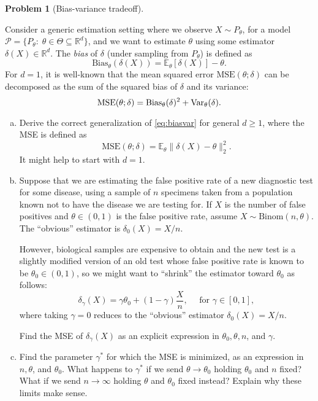 \documentclass{article}
\newcommand{\cP}{\mathcal{P}}
\newcommand{\EE}{\mathbb{E}}
\newcommand{\RR}{\mathbb{R}}
\newcommand{\Var}{\textnormal{Var}}
\theoremstyle{definition}
\newtheorem{problem}{Problem}
\begin{document}
\begin{problem}[Bias-variance tradeoff]
  \label{prob:bias-var}
  
  Consider a generic estimation setting where we observe $X \sim P_\theta$, for a model $\cP = \{P_\theta:\; \theta \in \Theta \subseteq \RR^d\}$, and we want to estimate $\theta$ using some estimator $\delta(X) \in \RR^d$. The {\em bias} of $\delta$ (under sampling from $P_\theta$) is defined as
  \[
  \text{Bias}_\theta(\delta(X)) = \EE_\theta[\delta(X)] - \theta. 
  \]
  For $d=1$, it is well-known that the mean squared error $\text{MSE}(\theta; \delta)$ can be decomposed as the sum of the squared bias of $\delta$ and its variance:
  \begin{equation}\label{eq:biasvar}
    \text{MSE}(\theta; \delta) = \text{Bias}_\theta(\delta)^2 + \Var_\theta(\delta).
  \end{equation}
  
  
  \begin{enumerate}[(a)]
  \item Derive the correct generalization of \eqref{eq:biasvar} for general $d \geq 1$, where the MSE is defined as
    \[
    \text{MSE}(\theta; \delta) = \EE_\theta \|\delta(X) - \theta\|_2^2.
    \]
    It might help to start with $d=1$.
    
    
    
  \item Suppose that we are estimating the false positive rate of a new diagnostic test for some disease, using a sample of $n$ specimens taken from a population known not to have the disease we are testing for. If $X$ is the number of false positives and $\theta \in (0,1)$ is the false positive rate, assume $X \sim \text{Binom}(n, \theta)$. The ``obvious'' estimator is $\delta_0(X) = X/n$.
    
    However, biological samples are expensive to obtain and the new test is a slightly modified version of an old test whose false positive rate is known to be $\theta_0 \in (0,1)$, so we might want to ``shrink'' the estimator toward $\theta_0$ as follows:
    \[
    \delta_{\gamma}(X) = \gamma \theta_0 + (1-\gamma) \frac{X}{n}, \quad \text{ for } \gamma \in [0,1],
    \]
    where taking $\gamma = 0$ reduces to the ``obvious'' estimator $\delta_0(X) = X/n$.
    
    Find the MSE of $\delta_\gamma(X)$ as an explicit expression in $\theta_0, \theta, n$, and $\gamma$.
    
    
    
  \item Find the parameter $\gamma^*$ for which the MSE is minimized, as an expression in $n, \theta$, and $\theta_0$. What happens to $\gamma^*$ if we send $\theta \to \theta_0$ holding $\theta_0$ and $n$ fixed? What if we send $n\to\infty$ holding $\theta$ and $\theta_0$ fixed instead? Explain why these limits make sense.


\end{enumerate}
\end{problem}
\end{document}
